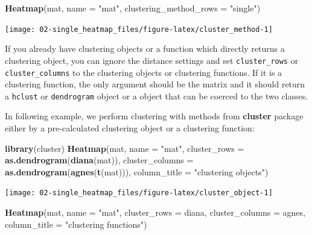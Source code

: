 \documentclass[]{book}
\newenvironment{Shaded}{\begin{snugshade}}{\end{snugshade}}
\newcommand{\KeywordTok}[1]{\textcolor[rgb]{0.13,0.29,0.53}{\textbf{#1}}}
\newcommand{\DataTypeTok}[1]{\textcolor[rgb]{0.13,0.29,0.53}{#1}}
\newcommand{\StringTok}[1]{\textcolor[rgb]{0.31,0.60,0.02}{#1}}
\newcommand{\NormalTok}[1]{#1}
\theoremstyle{definition}
\theoremstyle{definition}
\theoremstyle{definition}
\theoremstyle{remark}
\begin{document}
\begin{Shaded}
\begin{Highlighting}[]
\KeywordTok{Heatmap}\NormalTok{(mat, }\DataTypeTok{name =} \StringTok{"mat"}\NormalTok{, }\DataTypeTok{clustering_method_rows =} \StringTok{"single"}\NormalTok{)}
\end{Highlighting}
\end{Shaded}

\begin{center}\texttt{[image: 02-single\_heatmap\_files/figure-latex/cluster\_method-1]} \end{center}

If you already have clustering objects or a function which directly
returns a clustering object, you can ignore the distance settings and
set \texttt{cluster\_rows} or \texttt{cluster\_columns} to the
clustering objects or clustering functions. If it is a clustering
function, the only argument should be the matrix and it should return a
\texttt{hclust} or \texttt{dendrogram} object or a object that can be
coerced to the two classes.

In following example, we perform clustering with methods from
\textbf{cluster} package either by a pre-calculated clustering object or
a clustering function:

\begin{Shaded}
\begin{Highlighting}[]
\KeywordTok{library}\NormalTok{(cluster)}
\KeywordTok{Heatmap}\NormalTok{(mat, }\DataTypeTok{name =} \StringTok{"mat"}\NormalTok{, }\DataTypeTok{cluster_rows =} \KeywordTok{as.dendrogram}\NormalTok{(}\KeywordTok{diana}\NormalTok{(mat)),}
   \DataTypeTok{cluster_columns =} \KeywordTok{as.dendrogram}\NormalTok{(}\KeywordTok{agnes}\NormalTok{(}\KeywordTok{t}\NormalTok{(mat))), }\DataTypeTok{column_title =} \StringTok{"clustering objects"}\NormalTok{)}
\end{Highlighting}
\end{Shaded}

\begin{center}\texttt{[image: 02-single\_heatmap\_files/figure-latex/cluster\_object-1]} \end{center}

\begin{Shaded}
\begin{Highlighting}[]
\KeywordTok{Heatmap}\NormalTok{(mat, }\DataTypeTok{name =} \StringTok{"mat"}\NormalTok{, }\DataTypeTok{cluster_rows =}\NormalTok{ diana,}
   \DataTypeTok{cluster_columns =}\NormalTok{ agnes, }\DataTypeTok{column_title =} \StringTok{"clustering functions"}\NormalTok{)}
\end{Highlighting}
\end{Shaded}
\end{document}

